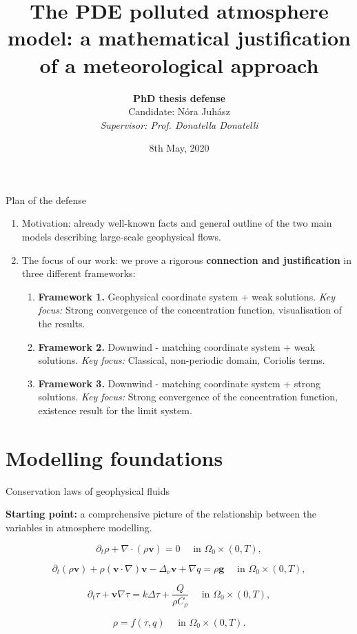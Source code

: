 \documentclass{beamer}
\title{The PDE polluted atmosphere model: a mathematical justification of a meteorological approach}
\author[N\'ora Juh\'asz]{\textbf{PhD thesis defense} \\[2mm] Candidate: N\'ora Juh\'asz \\[1mm] \textit{Supervisor: Prof. Donatella Donatelli}}
\institute{Department of Information Engineering, Computer Science and Mathematics \\ University of L'Aquila }
\date{8th May, 2020}
\begin{document}
\begin{frame}
\titlepage
\end{frame}

\begin{frame}{Plan of the defense}

\begin{enumerate}
\item Motivation: already well-known facts and general outline of the two main models describing large-scale geophysical flows.
\item The focus of our work: we prove a rigorous \textbf{connection and justification} in three different frameworks:
\begin{enumerate}
\item \textbf{Framework 1.} Geophysical coordinate system + weak solutions. \textit{\textcolor{mediumred-violet}{Key focus}:} Strong convergence of the concentration function, visualisation of the results.
\item \textbf{Framework 2.} Downwind - matching coordinate system + weak solutions. \textit{\textcolor{mediumred-violet}{Key focus}:} Classical, non-periodic domain, Coriolis terms.
\item \textbf{Framework 3.} Downwind - matching coordinate system + strong solutions. \textit{\textcolor{mediumred-violet}{Key focus}:} Strong convergence of the concentration function, existence result for the limit system.
\end{enumerate}
\end{enumerate}

\end{frame}

\section{Modelling foundations}

\begin{frame}{Conservation laws of geophysical fluids}

\textbf{Starting point:} a comprehensive picture of the relationship between the variables in atmosphere modelling.

$$ \partial_t \rho + \nabla \cdot (\rho \mathbf{v})  = 0 \quad \text{ in } \Omega_0 \times (0,T), $$

$$ \partial_t (\rho \mathbf{v}) + \rho (\mathbf{v} \cdot \nabla)\mathbf{v} -\Delta_{\nu} \mathbf{v} + \nabla q = \rho \mathbf{g} \quad \text{ in } \Omega_0 \times (0,T), $$

$$ \partial_t \tau + \mathbf{v} \nabla \tau = k \Delta \tau + \frac{Q}{\rho C_\rho} \quad \text{ in } \Omega_0 \times (0,T), $$

$$ \rho = f(\tau, q)  \quad \text{ in } \Omega_0 \times (0,T). $$

\end{frame}
\end{document}
